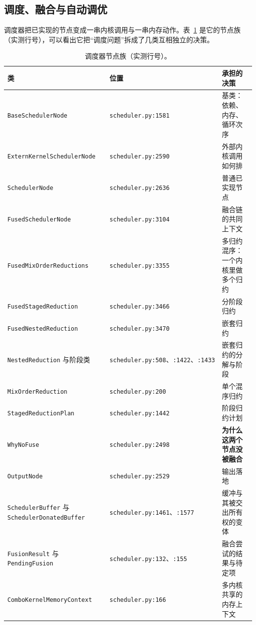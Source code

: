 \subsection{调度、融合与自动调优}

调度器把已实现的节点变成一串内核调用与一串内存动作。表~\ref{tab:be:sched} 是它的节点族（实测行号），可以看出它把“调度问题”拆成了几类互相独立的决策。

\begin{table}[H]
\centering
\caption{调度器节点族（实测行号）。}
\label{tab:be:sched}
\small
\begin{tabular}{lll}
\toprule
类 & 位置 & 承担的决策 \\
\midrule
\texttt{BaseSchedulerNode} & \texttt{scheduler.py:1581} & 基类：依赖、内存、循环次序 \\
\texttt{ExternKernelSchedulerNode} & \texttt{scheduler.py:2590} & 外部内核调用如何排 \\
\texttt{SchedulerNode} & \texttt{scheduler.py:2636} & 普通已实现节点 \\
\texttt{FusedSchedulerNode} & \texttt{scheduler.py:3104} & 融合链的共同上下文 \\
\texttt{FusedMixOrderReductions} & \texttt{scheduler.py:3355} & 多归约混序：一个内核里做多个归约 \\
\texttt{FusedStagedReduction} & \texttt{scheduler.py:3466} & 分阶段归约 \\
\texttt{FusedNestedReduction} & \texttt{scheduler.py:3470} & 嵌套归约 \\
\texttt{NestedReduction} 与阶段类 & \texttt{scheduler.py:508}、\texttt{:1422}、\texttt{:1433} & 嵌套归约的分解与阶段 \\
\texttt{MixOrderReduction} & \texttt{scheduler.py:200} & 单个混序归约 \\
\texttt{StagedReductionPlan} & \texttt{scheduler.py:1442} & 阶段归约计划 \\
\texttt{WhyNoFuse} & \texttt{scheduler.py:2498} & \textbf{为什么这两个节点没被融合} \\
\texttt{OutputNode} & \texttt{scheduler.py:2529} & 输出落地 \\
\hline
\texttt{SchedulerBuffer} 与 \texttt{SchedulerDonatedBuffer} & \texttt{scheduler.py:1461}、\texttt{:1577} & 缓冲与其被交出所有权的变体 \\
\texttt{FusionResult} 与 \texttt{PendingFusion} & \texttt{scheduler.py:132}、\texttt{:155} & 融合尝试的结果与待定项 \\
\texttt{ComboKernelMemoryContext} & \texttt{scheduler.py:166} & 多内核共享的内存上下文 \\
\bottomrule
\end{tabular}
\end{table}


